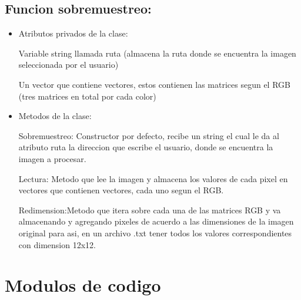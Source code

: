 \documentclass{article}
\begin{document}
\subsection{Funcion sobremuestreo:}
\begin{itemize}
\item Atributos privados de la clase:

\hspace{0.5cm}Variable string llamada ruta (almacena la ruta donde se encuentra la imagen seleccionada por el usuario)

\hspace{0.5cm}Un vector que contiene vectores, estos contienen las matrices segun el RGB (tres matrices en total por cada color)

\item Metodos de la clase:

\hspace{0.5cm}Sobremuestreo: Constructor por defecto, recibe un string el cual le da al atributo ruta la direccion que escribe el usuario, donde se encuentra la imagen a procesar.

\hspace{0.5cm}Lectura: Metodo que lee la imagen y almacena los valores de cada pixel en vectores que contienen vectores, cada uno segun el RGB.

\hspace{0.5cm}Redimension:Metodo que itera sobre cada una de las matrices RGB y va almacenando y agregando pixeles de acuerdo a las dimensiones de la imagen original para asi, en un archivo .txt tener todos los valores correspondientes con dimension 12x12.


\end{itemize}

\section{Modulos de codigo}
\end{document}
